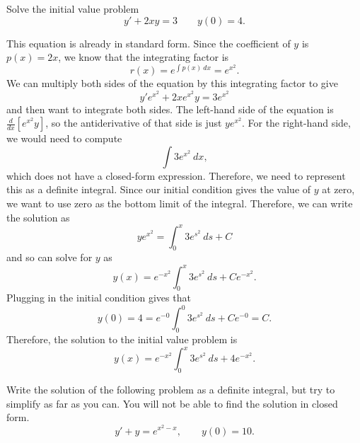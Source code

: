 \documentclass{ximera}
\begin{document}
\begin{example}
    Solve the initial value problem
    \begin{equation*}
        y' + 2xy = 3 \qquad y(0) = 4.
    \end{equation*}
\end{example}
\begin{exampleSol}
    This equation is already in standard form. Since the coefficient of $y$ is $p(x) = 2x$, we know that the integrating factor is 
    \begin{equation*}
        r(x) = e^{\int p(x)\ dx} = e^{x^2}.
    \end{equation*}
    We can multiply both sides of the equation by this integrating factor to give
    \begin{equation*}
        y'e^{x^2} + 2xe^{x^2}y = 3e^{x^2}
    \end{equation*} 
    and then want to integrate both sides. The left-hand side of the equation is $\frac{d}{dx}[e^{x^2}y]$, so the antiderivative of that side is just $ye^{x^2}$. For the right-hand side, we would need to compute
    \[ 
        \int 3e^{x^2}\ dx, 
    \] 
    which does not have a closed-form expression. Therefore, we need to represent this as a definite integral. Since our initial condition gives the value of $y$ at zero, we want to use zero as the bottom limit of the integral. Therefore, we can write the solution as
    \[ 
        ye^{x^2} = \int_0^x 3e^{s^2}\ ds + C 
    \] 
    and so can solve for $y$ as
    \begin{equation*}
        y(x) = e^{-x^2} \int_0^x 3e^{s^2}\ ds + Ce^{-x^2}.
    \end{equation*}
    Plugging in the initial condition gives that
    \begin{equation*}
        y(0) = 4 = e^{-0} \int_0^0 3e^{s^2}\ ds + Ce^{-0} = C.
    \end{equation*}
    Therefore, the solution to the initial value problem is
    \begin{equation*}
        y(x) = e^{-x^2} \int_0^x 3e^{s^2}\ ds + 4e^{-x^2}.
    \end{equation*}
\end{exampleSol}


\begin{exercise}
    Write the solution of the following problem as a definite integral, but try to simplify as far as you can.  You will not be able to find the solution in closed form.
    \begin{equation*}
        y' + y = e^{x^2-x}, \qquad y(0) = 10 .
    \end{equation*}
\end{exercise}
\end{document}
